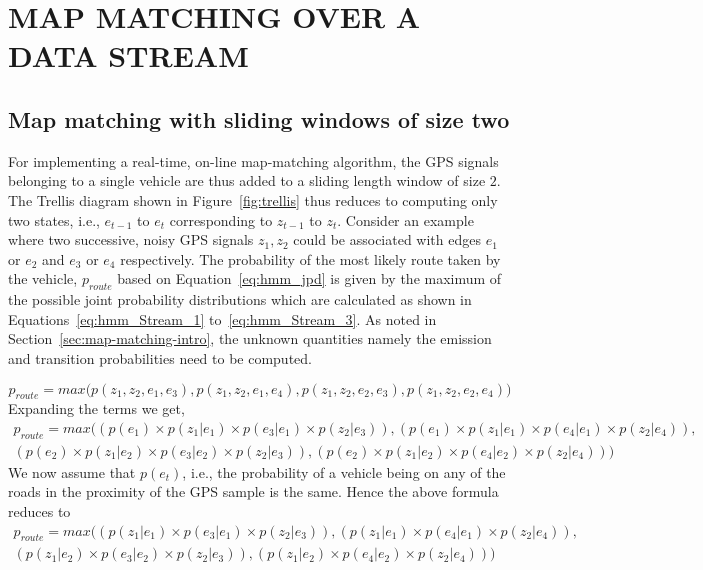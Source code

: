 \documentclass{wscpaperproc}
\theoremstyle{wsc}
\begin{document}
\section{MAP MATCHING OVER A DATA STREAM}
\label{sec:map-matching-stream}

\subsection{Map matching with sliding windows of size two}
\label{subsec:sliding-window}

 For implementing a real-time, on-line map-matching algorithm, the GPS signals belonging to a single vehicle are thus added to a sliding length window of size $2$. The  Trellis diagram shown in Figure~\ref{fig:trellis} thus reduces to computing only two states, i.e., $e_{t-1}$ to $e_{t}$ corresponding to $z_{t-1}$ to $z_{t}$. Consider an example where two successive, noisy GPS signals $z_{1},z_{2}$ could be associated with edges $e_{1}$ or $e_{2}$ and $e_{3}$ or $e_{4}$ respectively. The probability of the most likely route taken by the vehicle, $p_{route}$ based on Equation~\ref*{eq:hmm_jpd} is given by the maximum of the possible joint probability distributions which are calculated as shown in Equations~\ref{eq:hmm_Stream_1} to~\ref{eq:hmm_Stream_3}. As noted in Section~\ref{sec:map-matching-intro}, the unknown quantities namely the emission and transition probabilities need to be computed. 

\begin{equation} \label{eq:hmm_Stream_1}
p_{route}=max\Biggl(p(z_{1},z_{2},e_{1},e_{3}),p(z_{1},z_{2},e_{1},e_{4}),p(z_{1},z_{2},e_{2},e_{3}),p(z_{1},z_{2},e_{2},e_{4})\Biggr)
\end{equation}
Expanding the terms we get,
\begin{equation} \label{eq:hmm_Stream_2}
\begin{split}
p_{route}=max\Biggl((p(e_{1})\times p(z_{1}|e_{1})\times p(e_{3}|e_{1})\times p(z_{2}|e_{3})), (p(e_{1})\times p(z_{1}|e_{1})\times p(e_{4}|e_{1})\times p(z_{2}|e_{4})),\\ (p(e_{2})\times p(z_{1}|e_{2})\times p(e_{3}|e_{2})\times p(z_{2}|e_{3})), (p(e_{2})\times p(z_{1}|e_{2})\times p(e_{4}|e_{2})\times p(z_{2}|e_{4}))\Biggr)
\end{split}
\end{equation}
We now assume that $p(e_{t})$, i.e., the probability of a vehicle being on any of the roads in the proximity of the GPS sample is the same. Hence the above formula reduces to
\begin{equation} \label{eq:hmm_Stream_3}
\begin{split}
p_{route}=max\Biggl((p(z_{1}|e_{1})\times p(e_{3}|e_{1})\times p(z_{2}|e_{3})), (p(z_{1}|e_{1})\times p(e_{4}|e_{1})\times p(z_{2}|e_{4})),\\ (p(z_{1}|e_{2})\times p(e_{3}|e_{2})\times p(z_{2}|e_{3})), (p(z_{1}|e_{2})\times p(e_{4}|e_{2})\times p(z_{2}|e_{4}))\Biggr)
\end{split}
\end{equation}
\end{document}
